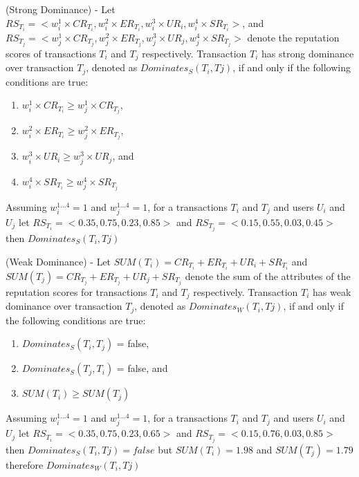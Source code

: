 \begin{definition}
\label{def:strong_dominance}
(Strong Dominance) - Let $RS_{T_{i}} = <w_{i}^{1}\times CR_{T_{i}},w_{i}^{2}\times ER_{T_{i}},w_{i}^{3}\times UR_{i},w_{i}^{4}\times SR_{T_{i}}>$, and $RS_{T_{j}} = <w_{j}^{1}\times CR_{T_{j}},w_{j}^{2}\times ER_{T_{j}},w_{j}^{3}\times UR_{j},w_{j}^{4}\times SR_{T_{j}}>$ denote the reputation scores of transactions $T_{i}$ and $T_{j}$ respectively. Transaction $T_{i}$ has strong dominance over transaction $T_{j}$, denoted as $Dominates_{S}(T_{i},T{j})$, if and only if the following conditions are true: 

\begin{enumerate}
    \item $w_{i}^{1} \times CR_{T_{i}} \geq w_{j}^{1} \times CR_{T_{j}}$,
    \item $w_{i}^{2} \times ER_{T_{i}} \geq w_{j}^{2} \times ER_{T_{j}}$,
    \item $w_{i}^{3} \times UR_{i} \geq w_{j}^{3} \times UR_{j}$, and
    \item $w_{i}^{4} \times SR_{T_{i}} \geq w_{j}^{4} \times SR_{T_{j}}$
\end{enumerate}

\begin{example}
Assuming $w_{i}^{1...4} = 1$ and $w_{j}^{1...4} = 1$, for a transactions $T_{i}$ and $T_{j}$ and users $U_{i}$ and $U_{j}$ let $RS_{T_{i}} = <0.35,0.75,0.23,0.85>$ and $RS_{T_{j}} = <0.15,0.55,0.03,0.45>$ then $Dominates_{S}(T_{i},T{j})$
\end{example}
\end{definition}

\begin{definition}
\label{def:weak_dominance}
(Weak Dominance) - Let $SUM(T_{i}) = CR_{T_{i}} + ER_{T_{i}} + UR_{i} + SR_{T_{i}}$ and $SUM(T_{j}) = CR_{T_{j}} + ER_{T_{j}} + UR_{j} + SR_{T_{j}}$ denote the sum of the attributes of the reputation scores for transactions $T_{i}$ and $T_{j}$ respectively. Transaction $T_{i}$ has weak dominance over transaction $T_{j}$, denoted as $Dominates_{W}(T_{i},T{j})$, if and only if the following conditions are true:
\begin{enumerate}
    \item $Dominates_{S}(T_{i},T_{j})$ = false,
    \item $Dominates_{S}(T_{j},T_{i})$ = false, and
    \item $SUM(T_{i}) \geq SUM(T_{j})$
\end{enumerate}

\begin{example}
Assuming $w_{i}^{1...4} = 1$ and $w_{j}^{1...4} = 1$, for a transactions $T_{i}$ and $T_{j}$ and users $U_{i}$ and $U_{j}$ let $RS_{T_{i}} = <0.35,0.75,0.23,0.65>$ and $RS_{T_{j}} = <0.15,0.76,0.03,0.85>$ then $Dominates_{S}(T_{i},T{j}) = false$ but $SUM(T_{i}) = 1.98$ and $SUM(T_{j}) = 1.79$ therefore $Dominates_{W}(T_{i},T{j})$
\end{example}
\end{definition}

